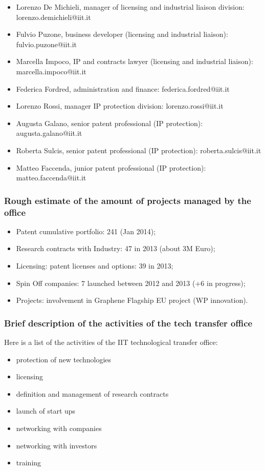 \documentclass[12pt,a4paper,twoside]{article}
\begin{document}
\begin{itemize}
\item Lorenzo De Michieli, manager of licensing and industrial liaison division: lorenzo.demichieli@iit.it

\item Fulvio Puzone, business developer (licensing and industrial liaison): fulvio.puzone@iit.it

\item Marcella Impoco, IP and contracts lawyer (licensing and industrial liaison): marcella.impoco@iit.it

\item Federica Fordred, administration and finance: federica.fordred@iit.it

\item Lorenzo Rossi, manager IP protection division: lorenzo.rossi@iit.it

\item Augusta Galano, senior patent professional (IP protection): augusta.galano@iit.it

\item Roberta Sulcis, senior patent professional (IP protection): roberta.sulcis@iit.it

\item Matteo Faccenda, junior patent professional (IP protection): matteo.faccenda@iit.it
\end{itemize}

\subsubsection{Rough estimate of the amount of projects managed by the office}
\begin{itemize}
\item Patent cumulative portfolio: 241 (Jan 2014);
\item Research contracts with Industry:  47 in 2013 (about 3M Euro);
\item Licensing: patent licenses and options: 39 in 2013;
\item Spin Off companies: 7 launched between 2012 and 2013 (+6 in progress);
\item Projects: involvement in Graphene Flagship EU project (WP innovation).
\end{itemize}

\subsubsection{Brief description of the activities of the tech transfer office}
Here is a list of the activities of the IIT technological transfer office:
\begin{itemize}
\item protection of new technologies
\item licensing
\item definition and management of research contracts
\item launch of start ups
\item networking with companies
\item networking with investors
\item training
\end{itemize}
\end{document}
